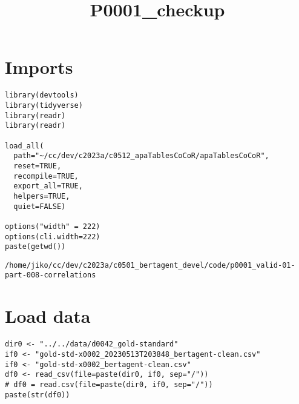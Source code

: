 \documentclass[a4paper,10pt,onecolumn,oneside,openright]{article}
\date{}
\title{P0001\_checkup}
\begin{document}
\maketitle



\section{Imports}
\label{sec:orgf6701ae}
\begin{verbatim}
library(devtools)
library(tidyverse)
library(readr)
library(readr)

load_all(
  path="~/cc/dev/c2023a/c0512_apaTablesCoCoR/apaTablesCoCoR",
  reset=TRUE,
  recompile=TRUE,
  export_all=TRUE,
  helpers=TRUE,
  quiet=FALSE)

options("width" = 222)
options(cli.width=222)
paste(getwd())
\end{verbatim}

\begin{verbatim}
/home/jiko/cc/dev/c2023a/c0501_bertagent_devel/code/p0001_valid-01-part-008-correlations
\end{verbatim}
\section{Load data}
\label{sec:org04e289a}
\begin{verbatim}
dir0 <- "../../data/d0042_gold-standard"
if0 <- "gold-std-x0002_20230513T203848_bertagent-clean.csv"
if0 <- "gold-std-x0002_bertagent-clean.csv"
df0 <- read_csv(file=paste(dir0, if0, sep="/"))
# df0 = read.csv(file=paste(dir0, if0, sep="/"))
paste(str(df0))
\end{verbatim}
\end{document}
